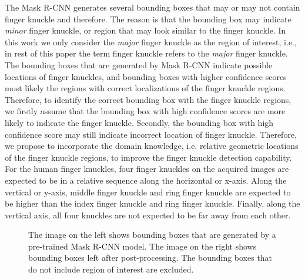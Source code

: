 The Mask R-CNN generates several bounding boxes that may or may not contain finger knuckle and therefore. The reason is that the bounding box may indicate \textit{minor} finger knuckle, or region that may look similar to the finger knuckle. In this work we only consider the \textit{major} finger knuckle as the region of interest, i.e., in rest of this paper the term finger knuckle refers to the \textit{major} finger knuckle. The bounding boxes that are generated by Mask R-CNN indicate possible locations of finger knuckles, and bounding boxes with higher confidence scores most likely the regions with correct localizations of the finger knuckle regions. Therefore, to identify the correct bounding box with the finger knuckle regions, we firstly assume that the bounding box with high confidence scores are more likely to indicate the finger knuckle. Secondly, the bounding box with high confidence score may still indicate incorrect location of finger knuckle. Therefore, we propose to incorporate the domain knowledge, i.e. relative geometric locations of the finger knuckle regions, to improve the finger knuckle detection capability. For the human finger knuckles, four finger knuckles on the acquired images are expected to be in a relative sequence along the horizontal or x-axis. Along the vertical or y-axis, middle finger knuckle and ring finger knuckle are expected to be higher than the index finger knuckle and ring finger knuckle. Finally, along the vertical axis, all four knuckles are not expected to be far away from each other.

\begin{figure}[ht!]
    \centering

    \caption{The image on the left shows bounding boxes that are generated by a pre-trained Mask R-CNN model. The image on the right shows bounding boxes left after post-processing. The bounding boxes that do not include region of interest are excluded.}
    \label{select-finger-knuckle}
\end{figure}


